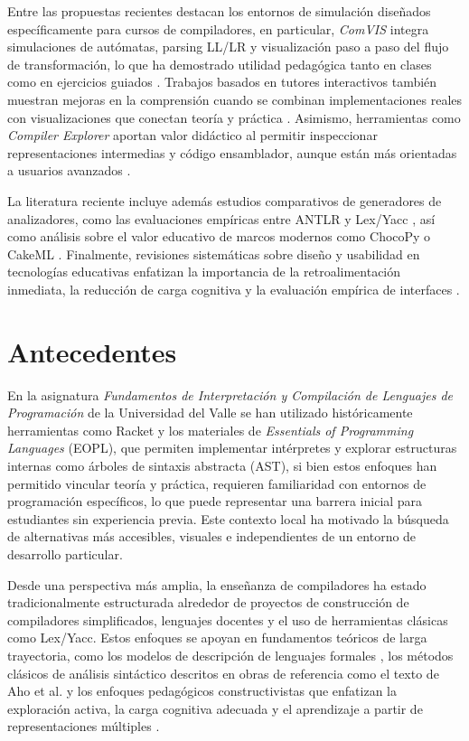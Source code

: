 Entre las propuestas recientes destacan los entornos de simulación diseñados específicamente para cursos de compiladores, en particular, \textit{ComVIS} integra simulaciones de autómatas, parsing LL/LR y visualización paso a paso del flujo de transformación, lo que ha demostrado utilidad pedagógica tanto en clases como en ejercicios guiados \cite{jovanovic2021comvis,Stamenković2024AWE}. Trabajos basados en tutores interactivos también muestran mejoras en la comprensión cuando se combinan implementaciones reales con visualizaciones que conectan teoría y práctica \cite{delvado2023itt}. Asimismo, herramientas como \textit{Compiler Explorer} aportan valor didáctico al permitir inspeccionar representaciones intermedias y código ensamblador, aunque están más orientadas a usuarios avanzados \cite{compilerexplorer2022}.

La literatura reciente incluye además estudios comparativos de generadores de analizadores, como las evaluaciones empíricas entre ANTLR y Lex/Yacc \cite{ortin2022antlr}, así como análisis sobre el valor educativo de marcos modernos como ChocoPy o CakeML \cite{daleman2024chocopy,myreen2021cakeml}. Finalmente, revisiones sistemáticas sobre diseño y usabilidad en tecnologías educativas enfatizan la importancia de la retroalimentación inmediata, la reducción de carga cognitiva y la evaluación empírica de interfaces \cite{lu2022usability}.

\section{Antecedentes}
En la asignatura \emph{Fundamentos de Interpretación y Compilación de Lenguajes de Programación} de la Universidad del Valle se han utilizado históricamente herramientas como Racket y los materiales de \emph{Essentials of Programming Languages} (EOPL), que permiten implementar intérpretes y explorar estructuras internas como árboles de sintaxis abstracta (AST), si bien estos enfoques han permitido vincular teoría y práctica, requieren familiaridad con entornos de programación específicos, lo que puede representar una barrera inicial para estudiantes sin experiencia previa. Este contexto local ha motivado la búsqueda de alternativas más accesibles, visuales e independientes de un entorno de desarrollo particular.

Desde una perspectiva más amplia, la enseñanza de compiladores ha estado tradicionalmente estructurada alrededor de proyectos de construcción de compiladores simplificados, lenguajes docentes y el uso de herramientas clásicas como Lex/Yacc. Estos enfoques se apoyan en fundamentos teóricos de larga trayectoria, como los modelos de descripción de lenguajes formales \cite{gordon2024linguistics}, los métodos clásicos de análisis sintáctico descritos en obras de referencia como el texto de Aho et al. \cite{10.5555/1177220} y los enfoques pedagógicos constructivistas que enfatizan la exploración activa, la carga cognitiva adecuada y el aprendizaje a partir de representaciones múltiples \cite{benitez2023constructivismo,sweller2024cognitive, hernandez2022aprendizaje,betancur2023aplicacion}.

